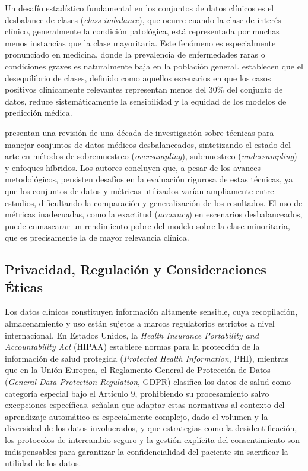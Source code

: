 Un desafío estadístico fundamental en los conjuntos de datos clínicos es el desbalance de clases 
(\textit{class imbalance}), que ocurre cuando la clase de interés clínico, generalmente la 
condición patológica, está representada por muchas menos instancias que la clase mayoritaria. 
Este fenómeno es especialmente pronunciado en medicina, donde la prevalencia de enfermedades 
raras o condiciones graves es naturalmente baja en la población general. \textcite{Abdelhay2025} 
establecen que el desequilibrio de clases, definido como aquellos escenarios en que los casos 
positivos clínicamente relevantes representan menos del 30\% del conjunto de datos, reduce 
sistemáticamente la sensibilidad y la equidad de los modelos de predicción médica. 

\textcite{Salmi2024} presentan una revisión de una década de investigación sobre técnicas para 
manejar conjuntos de datos médicos desbalanceados, sintetizando el estado del arte en métodos 
de sobremuestreo (\textit{oversampling}), submuestreo (\textit{undersampling}) y enfoques 
híbridos. Los autores concluyen que, a pesar de los avances metodológicos, persisten desafíos 
en la evaluación rigurosa de estas técnicas, ya que los conjuntos de datos y métricas utilizados 
varían ampliamente entre estudios, dificultando la comparación y generalización de los resultados. 
El uso de métricas inadecuadas, como la exactitud 
(\textit{accuracy}) en escenarios desbalanceados, puede enmascarar un rendimiento pobre del 
modelo sobre la clase minoritaria, que es precisamente la de mayor relevancia clínica.


\subsection{Privacidad, Regulación y Consideraciones Éticas}

Los datos clínicos constituyen información altamente sensible, cuya recopilación, almacenamiento y 
uso están sujetos a marcos regulatorios estrictos a nivel internacional. En Estados Unidos, la 
\textit{Health Insurance Portability and Accountability Act} (HIPAA) establece normas para la 
protección de la información de salud protegida (\textit{Protected Health Information}, PHI), 
mientras que en la Unión Europea, el Reglamento General de Protección de Datos (\textit{General Data Protection Regulation}, GDPR) 
clasifica los datos de salud como categoría especial bajo el Artículo 9, prohibiendo su 
procesamiento salvo excepciones específicas. \textcite{Alhumaidi2025} señalan que adaptar estas 
normativas al contexto del aprendizaje automático es especialmente complejo, dado el volumen 
y la diversidad de los datos involucrados, y que estrategias como la desidentificación, los 
protocolos de intercambio seguro y la gestión explícita del consentimiento son indispensables 
para garantizar la confidencialidad del paciente sin sacrificar la utilidad de los datos.

